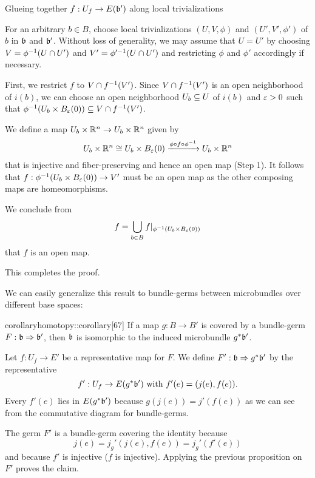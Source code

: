 \begin{myproof}
\begin{steps}
        \item Glueing together $f: U_f \to E(\bb')$ along local trivializations

        For an arbitrary $b \in B$, choose local trivializations $(U, V, \phi)$ and $(U', V', \phi')$ of $b$ in $\bb$ and $\bb'$.
        Without loss of generality,
        we may assume that $U = U'$ by choosing $V = \phi^{-1}(U \cap U')$ and $V' = \phi'^{-1}(U \cap U')$
        and restricting $\phi$ and $\phi'$ accordingly if necessary. 
        
        First, we restrict $f$ to $V \cap f^{-1}(V')$.
        Since $V \cap f^{-1}(V')$ is an open neighborhood of $i(b)$, we can choose
        an open neighborhood $U_b \subseteq{} U$ of $i(b)$ and $\varepsilon{} > 0$ such that $\inv{\phi}(U_b \cross \ball[\eps]) \sub V \cap \inv{f}(V')$.
        
        We define a map $U_b \times \mathbb{R}^n \to U_b \times \mathbb{R}^n$ given by
        \[ U_b \cross \R^n \cong  U_b \cross \ball[\eps] \xto{\phi \circ f \circ \inv{\phi}} U_b \cross \R^n \]
        that is injective and fiber-preserving and hence an open map (Step 1).
        It follows that $f: \inv{\phi}(U_b \cross \ball[\eps]) \to V'$
        must be an open map as the other composing maps are homeomorphisms.

        We conclude from 
        \[ f = \bigcup_{b \in B}f\restr{\inv{\phi}(U_b \cross \ball[\eps])} \]
        that $f$ is an open map.
    \end{steps}
    This completes the proof.
\end{myproof}

\begin{myparagraph}
    We can easily generalize this result to bundle-germs between microbundles over different base spaces:
\end{myparagraph}

\begin{mystatement}{corollary}{homotopy::corollary}[67]
    If a map $g: B \to B'$ is covered by a bundle-germ $\germdef{F}{\bb}{\bb'}$, then $\bb$ is isomorphic to the induced microbundle $\ind{g}\bb'$.
\end{mystatement}

\begin{myproof}
    Let $f: U_f \to E'$ be a representative map for $F$.
    We define $\germdef{F'}{\bb}{\ind{g}\bb'}$ by the representative
    \[ f': U_f \to E(\ind{g}\bb') \twith f'(e) = (j(e), f(e)). \]
    Every $f'(e)$ lies in $E(\ind{g}\bb')$ because
    $g(j(e)) = j'(f(e))$
    as we can see from the commutative diagram for bundle-germs.

    The germ $F'$ is a bundle-germ covering the identity because
    \[ j(e) = j_g'(j(e), f(e)) = j_g'(f'(e)) \]
    and because $f'$ is injective ($f$ is injective).
    Applying the previous proposition on $F'$ proves the claim.
\end{myproof}